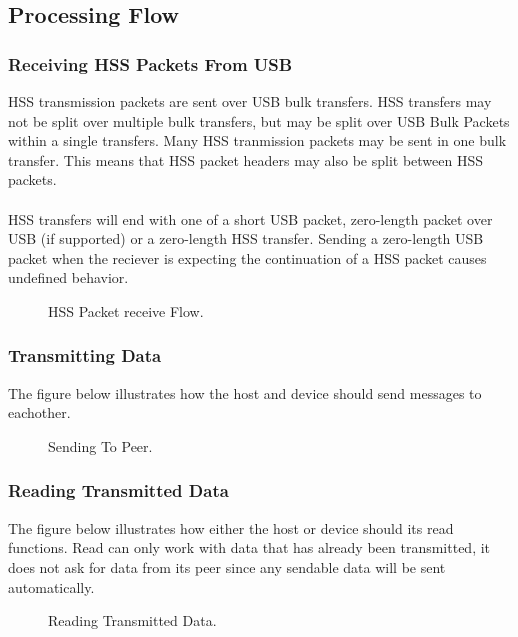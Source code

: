 \documentclass[10pt]{article}
\begin{document}
	\subsection{Processing Flow}
	\subsubsection{Receiving HSS Packets From USB}
	HSS transmission packets are sent over USB bulk transfers. HSS transfers may not be split over multiple bulk transfers, but may be split over USB Bulk Packets within a single transfers. Many HSS tranmission packets may be sent in one bulk transfer. This means that HSS packet headers may also be split between HSS packets. \\
	\\
	HSS transfers will end with one of a short USB packet, zero-length packet over USB (if supported) or a zero-length HSS transfer. Sending a zero-length USB packet when the reciever is expecting the continuation of a HSS packet causes undefined behavior. 
	\begin{figure}[H]
	\begin{center}
		\caption[HSS Packet receive Flow.]{HSS Packet receive Flow.}
		 \resizebox{\linewidth}{!}{}
	\end{center}
	\end{figure}

	\subsubsection{Transmitting Data}
	The figure below illustrates how the host and device should send messages to eachother. 
	\begin{figure}[H]
	\begin{center}
		\caption[Sending To Peer]{Sending To Peer.}
		\resizebox{\linewidth}{!}{}
	\end{center}
	\end{figure}


	\subsubsection{Reading Transmitted Data}
	The figure below illustrates how either the host or device should its read functions. Read can only work with data that has already been transmitted, it does not ask for data from its peer since any sendable data will be sent automatically. 
	\begin{figure}[H]
		\begin{center}
			\caption[Reading Transmitted Data.]{Reading Transmitted Data.}
			\resizebox{\linewidth}{!}{}
		\end{center}
	\end{figure}
\end{document}
